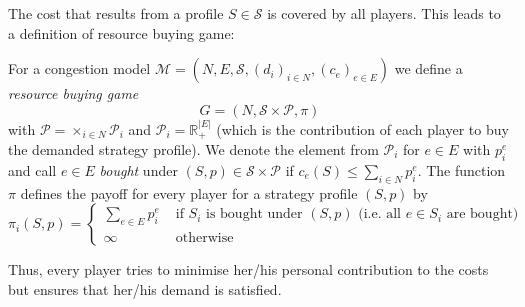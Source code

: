\documentclass{scrartcl}
\theoremstyle{nonumberplain}
\newcommand{\tupel}[1]{\left(#1\right)}
\begin{document}
The cost that results from a profile $S\in\mathcal{S}$ is covered by all
players. This leads to a definition of resource buying game:
\begin{defi}
  For a congestion model $\mathcal{M} = \tupel{N, E, \mathcal{S},
  \tupel{d_{i}}_{i\in N}, \tupel{c_{e}}_{e\in E}}$ we define a
  \emph{resource buying game}
  \begin{equation*}
    G = \tupel{N, \mathcal{S}\times\mathcal{P}, \pi}
  \end{equation*}
  with $\mathcal{P} = \times_{i\in N}\mathcal{P}_{i}$ and
  $\mathcal{P}_{i} = \mathbb{R}_{+}^{|E|}$ (which is the contribution of each
  player to buy the demanded strategy profile).
  We denote the element from $\mathcal{P}_{i}$ for $e\in E$ with $p_{i}^{e}$
  and call $e\in E$ \emph{bought} under $\tupel{S, p}\in
  \mathcal{S}\times\mathcal{P}$ if $c_{e}(S)\leq \sum_{i\in N}p_{i}^{e}$. The
  function $\pi$ defines the payoff for every player for a strategy profile
  $\tupel{S, p}$ by
  \begin{equation*}
    \pi_{i}(S, p) = \begin{cases}
      \sum_{e\in E}p_{i}^{e} &\text{ if $S_{i}$ is bought under
      $\tupel{S, p}$ (i.e. all $e\in S_{i}$ are bought)}\\
      \infty &\text{ otherwise}
    \end{cases}
  \end{equation*}
\end{defi}
Thus, every player tries to minimise her/his personal contribution to the costs
but ensures that her/his demand is satisfied.
\end{document}
